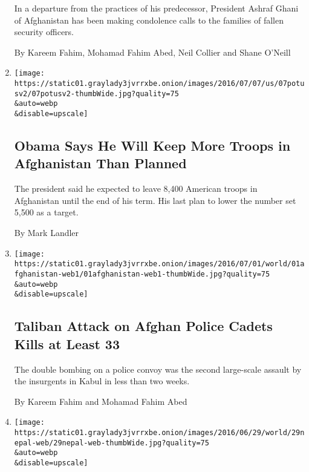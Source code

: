 \begin{enumerate}
  In a departure from the practices of his predecessor, President Ashraf
  Ghani of Afghanistan has been making condolence calls to the families
  of fallen security officers.

  By Kareem Fahim, Mohamad Fahim Abed, Neil Collier and Shane O'Neill
\item
  \href{/2016/07/07/world/asia/obama-afghanistan-troops.html}{}

  \texttt{[image: https://static01.graylady3jvrrxbe.onion/images/2016/07/07/us/07potusv2/07potusv2-thumbWide.jpg?quality=75\\\&auto=webp\\\&disable=upscale]}

  \hypertarget{obama-says-he-will-keep-more-troops-in-afghanistan-than-planned}{%
  \subsection{Obama Says He Will Keep More Troops in Afghanistan Than
  Planned}\label{obama-says-he-will-keep-more-troops-in-afghanistan-than-planned}}

  The president said he expected to leave 8,400 American troops in
  Afghanistan until the end of his term. His last plan to lower the
  number set 5,500 as a target.

  By Mark Landler
\item
  \href{/2016/07/01/world/asia/taliban-afghanistan-police-convoy-bombings.html}{}

  \texttt{[image: https://static01.graylady3jvrrxbe.onion/images/2016/07/01/world/01afghanistan-web1/01afghanistan-web1-thumbWide.jpg?quality=75\\\&auto=webp\\\&disable=upscale]}

  \hypertarget{taliban-attack-on-afghan-police-cadets-kills-at-least-33}{%
  \subsection{Taliban Attack on Afghan Police Cadets Kills at Least
  33}\label{taliban-attack-on-afghan-police-cadets-kills-at-least-33}}

  The double bombing on a police convoy was the second large-scale
  assault by the insurgents in Kabul in less than two weeks.

  By Kareem Fahim and Mohamad Fahim Abed
\item
  \href{/2016/06/29/world/asia/nepal-guards-kabul-afghanistan-taliban.html}{}

  \texttt{[image: https://static01.graylady3jvrrxbe.onion/images/2016/06/29/world/29nepal-web/29nepal-web-thumbWide.jpg?quality=75\\\&auto=webp\\\&disable=upscale]}


\end{enumerate}
